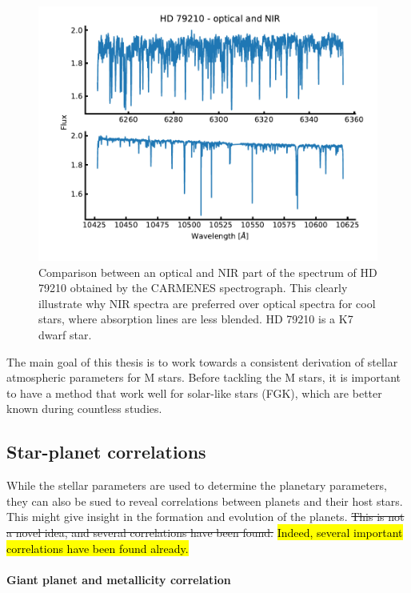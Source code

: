 \begin{figure}[htpb!]
    \centering
    \includegraphics[width=1.0\linewidth]{figures/opticalVSnir.pdf}
    \caption{Comparison between an optical and NIR part of the spectrum of HD 79210 obtained by
             the CARMENES spectrograph. This clearly illustrate why NIR spectra are preferred over
             optical spectra for cool stars, where absorption lines are less blended. HD 79210 is a
             K7 dwarf star.}
    \label{fig:opticalVSnir}
\end{figure}

The main goal of this thesis is to work towards a consistent derivation of stellar atmospheric
parameters for M stars. Before tackling the M stars, it is important to have a method that work well
for solar-like stars (FGK), which are better known during countless studies.

\subsection{Star-planet correlations}

While the stellar parameters are used to determine the planetary parameters, they can also be sued
to reveal correlations between planets and their host stars. This might give insight in the
formation and evolution of the planets. \st{This is not a novel idea, and several correlations have
been found.} \hl{Indeed, several important correlations have been found already.}

\paragraph{Giant planet and metallicity correlation}

